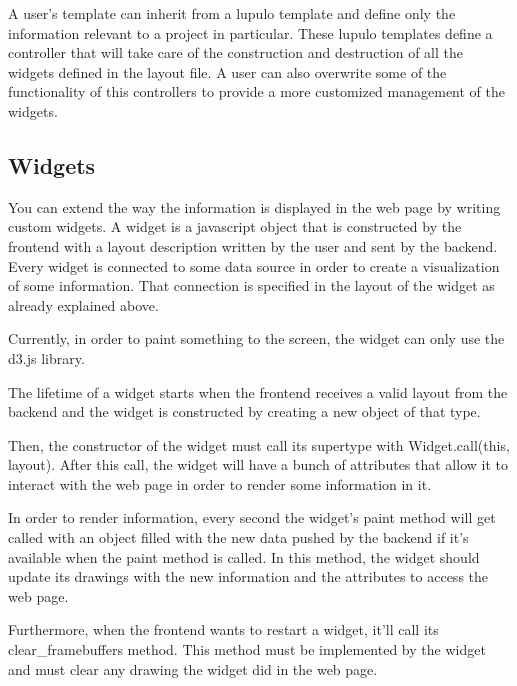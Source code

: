 \documentclass[12pt]{article}
\begin{document}
            A user's template can inherit from a lupulo template and define only
            the information relevant to a project in particular. These lupulo
            templates define a controller that will take care of the
            construction and destruction of all the widgets defined in the
            layout file. A user can also overwrite some of the functionality of
            this controllers to provide a more customized management of the
            widgets.

        \subsection{Widgets}
            You can extend the way the information is displayed in the web page
            by writing custom widgets. A widget is a javascript object that is
            constructed by the frontend with a layout description written by the
            user and sent by the backend. Every widget is connected to some data
            source in order to create a visualization of some information. That
            connection is specified in the layout of the widget as already
            explained above.

            Currently, in order to paint something to the screen, the widget can
            only use the d3.js library.

            The lifetime of a widget starts when the frontend receives a valid
            layout from the backend and the widget is constructed by creating a
            new object of that type.
            
            Then, the constructor of the widget must call its supertype with
            Widget.call(this, layout). After this call, the widget will have a
            bunch of attributes that allow it to interact with the web page in
            order to render some information in it.

            In order to render information, every second the widget's paint
            method will get called with an object filled with the new data
            pushed by the backend if it's available when the paint method is
            called. In this method, the widget should update its drawings with
            the new information and the attributes to access the web page.

            Furthermore, when the frontend wants to restart a widget, it'll
            call its clear\_framebuffers method. This method must be implemented
            by the widget and must clear any drawing the widget did in the web
            page.
\end{document}
